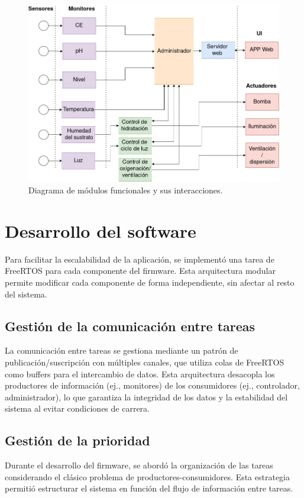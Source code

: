 \begin{figure}[h]
\centering
\includegraphics[scale=.4]{./Figures/arq_bloques.png}
	\caption{Diagrama de módulos funcionales y sus interacciones.}
	\label{fig:arq_bloques}
\end{figure}



\section{Desarrollo del software}

Para facilitar la escalabilidad de la aplicación, se implementó una tarea de FreeRTOS para cada componente del firmware. Esta arquitectura modular permite modificar cada componente de forma independiente, sin afectar al resto del sistema.

\subsection{Gestión de la comunicación entre tareas}
La comunicación entre tareas se gestiona mediante un patrón de publicación/suscripción con múltiples canales, que utiliza colas de FreeRTOS como buffers para el intercambio de datos. Esta arquitectura desacopla los productores de información (ej., monitores) de los consumidores (ej., controlador, administrador), lo que garantiza la integridad de los datos y la estabilidad del sistema al evitar condiciones de carrera.

\subsection{Gestión de la prioridad}
Durante el desarrollo del firmware, se abordó la organización de las tareas considerando el clásico problema de productores-consumidores. Esta estrategia permitió estructurar el sistema en función del flujo de información entre tareas.

